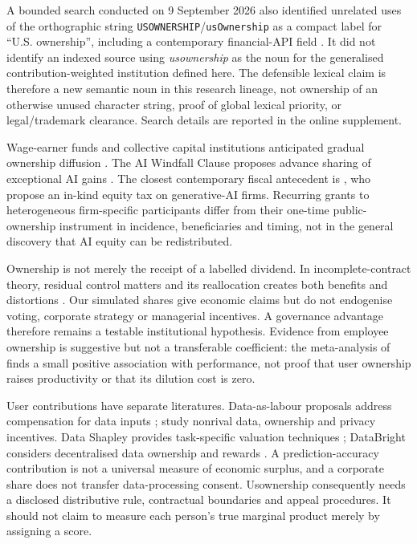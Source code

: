 A bounded search conducted on 9 September 2026 also identified unrelated uses of the orthographic string \texttt{USOWNERSHIP}/\texttt{usOwnership} as a compact label for ``U.S. ownership'', including a contemporary financial-API field \citep{straitsx2026}. It did not identify an indexed source using \emph{usownership} as the noun for the generalised contribution-weighted institution defined here. The defensible lexical claim is therefore a new semantic noun in this research lineage, not ownership of an otherwise unused character string, proof of global lexical priority, or legal/trademark clearance. Search details are reported in the online supplement.

Wage-earner funds and collective capital institutions anticipated gradual ownership diffusion \citep{meidner1981,pontusson1992,furendal2024}. The AI Windfall Clause proposes advance sharing of exceptional AI gains \citep{windfall2020}. The closest contemporary fiscal antecedent is \citet{bearerfriend2025}, who propose an in-kind equity tax on generative-AI firms. Recurring grants to heterogeneous firm-specific participants differ from their one-time public-ownership instrument in incidence, beneficiaries and timing, not in the general discovery that AI equity can be redistributed.

Ownership is not merely the receipt of a labelled dividend. In incomplete-contract theory, residual control matters and its reallocation creates both benefits and distortions \citep{grossmanhart1986}. Our simulated shares give economic claims but do not endogenise voting, corporate strategy or managerial incentives. A governance advantage therefore remains a testable institutional hypothesis. Evidence from employee ownership is suggestive but not a transferable coefficient: the meta-analysis of \citet{oboyle2016} finds a small positive association with performance, not proof that user ownership raises productivity or that its dilution cost is zero.

User contributions have separate literatures. Data-as-labour proposals address compensation for data inputs \citep{dataaslabour2018}; \citet{jones2020data} study nonrival data, ownership and privacy incentives. Data Shapley provides task-specific valuation techniques \citep{ghorbani2019}; DataBright considers decentralised data ownership and rewards \citep{databright2018}. A prediction-accuracy contribution is not a universal measure of economic surplus, and a corporate share does not transfer data-processing consent. Usownership consequently needs a disclosed distributive rule, contractual boundaries and appeal procedures. It should not claim to measure each person's true marginal product merely by assigning a score.

